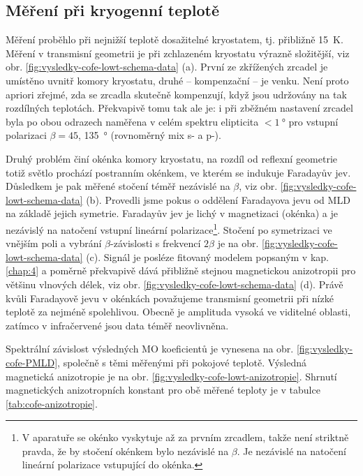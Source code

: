 \subsection{Měření při kryogenní teplotě}
\label{chap:vysledky-cofe-lowt}

Měření proběhlo při nejnižší teplotě dosažitelné kryostatem, tj. přibližně \SI{15}{\kelvin}.
Měření v transmisní geometrii je při zchlazeném kryostatu výrazně složitější, viz obr. \ref{fig:vysledky-cofe-lowt-schema-data} (a).
První ze zkřížených zrcadel je umístěno uvnitř komory kryostatu, druhé -- kompenzační -- je venku.
Není proto apriori zřejmé, zda se zrcadla skutečně kompenzují, když jsou udržovány na tak rozdílných teplotách.
Překvapivě tomu tak ale je: i při zběžném nastavení zrcadel byla po obou odrazech naměřena v celém spektru elipticita $<\SI{1}{\degree}$ pro vstupní polarizaci $\beta=45$, \SI{135}{\degree} (rovnoměrný mix s- a p-).

Druhý problém činí okénka komory kryostatu, na rozdíl od reflexní geometrie totiž světlo prochází postranním okénkem, ve kterém se indukuje Faradayův jev.
Důsledkem je pak měřené stočení téměř nezávislé na $\beta$, viz obr. \ref{fig:vysledky-cofe-lowt-schema-data} (b).
Provedli jsme pokus o oddělení Faradayova jevu od MLD na základě jejich symetrie.
Faradayův jev je lichý v magnetizaci (okénka) a je nezávislý na natočení vstupní lineární polarizace\footnote{V aparatuře se okénko vyskytuje až za prvním zrcadlem, takže není striktně pravda, že by stočení okénkem bylo nezávislé na $\beta$. Je nezávislé na natočení lineární polarizace vstupující do okénka.}.
Stočení po symetrizaci ve vnějším poli a vybrání $\beta$-závislosti s frekvencí $2\beta$ je na obr. \ref{fig:vysledky-cofe-lowt-schema-data} (c).
Signál je posléze fitovaný modelem popsaným v kap. \ref{chap:4} a poměrně překvapivě dává přibližně stejnou magnetickou anizotropii pro většinu vlnových délek, viz obr. \ref{fig:vysledky-cofe-lowt-schema-data} (d).
Právě kvůli Faradayově jevu v okénkách považujeme transmisní geometrii při nízké teplotě za nejméně spolehlivou.
Obecně je amplituda vysoká ve viditelné oblasti, zatímco v infračervené jsou data téměř neovlivněna.

Spektrální závislost výsledných MO koeficientů je vynesena na obr. \ref{fig:vysledky-cofe-PMLD}, společně s těmi měřenými při pokojové teplotě.
Výsledná magnetická anizotropie je na obr. \ref{fig:vysledky-cofe-lowt-anizotropie}.
Shrnutí magnetických anizotropních konstant pro obě měřené teploty je v tabulce \ref{tab:cofe-anizotropie}.

